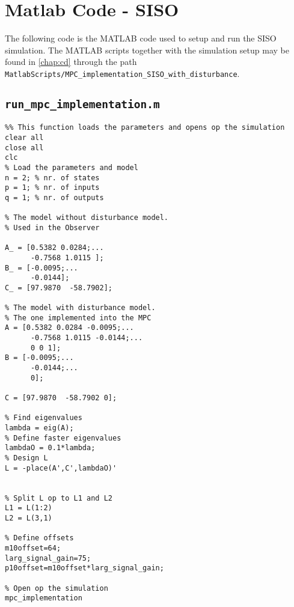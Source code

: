 \section{Matlab Code - SISO}
The following code is the MATLAB code used to setup and run the SISO simulation. The MATLAB scripts together with the simulation setup  may be found in \autoref{chap:cd} through the path \\ \texttt{MatlabScripts/MPC\_implementation\_SISO\_with\_disturbance}.
\subsection*{\texttt{run\_mpc\_implementation.m}}
\begin{lstlisting}
%% This function loads the parameters and opens op the simulation
clear all
close all
clc
% Load the parameters and model
n = 2; % nr. of states
p = 1; % nr. of inputs
q = 1; % nr. of outputs

% The model without disturbance model.
% Used in the Observer

A_ = [0.5382 0.0284;...
      -0.7568 1.0115 ];
B_ = [-0.0095;...
      -0.0144];
C_ = [97.9870  -58.7902];

% The model with disturbance model.
% The one implemented into the MPC
A = [0.5382 0.0284 -0.0095;...
      -0.7568 1.0115 -0.0144;...
      0 0 1];
B = [-0.0095;...
      -0.0144;...
      0];
  
C = [97.9870  -58.7902 0];

% Find eigenvalues
lambda = eig(A);
% Define faster eigenvalues
lambdaO = 0.1*lambda;
% Design L
L = -place(A',C',lambdaO)'


% Split L op to L1 and L2
L1 = L(1:2)
L2 = L(3,1)

% Define offsets
m10offset=64;
larg_signal_gain=75;
p10offset=m10offset*larg_signal_gain;

% Open op the simulation
mpc_implementation
\end{lstlisting}

